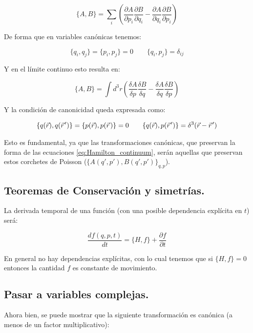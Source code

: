 \begin{equation}
	\{A, B\} = \sum_i\left(\frac{\partial A}{\partial p_i}\frac{\partial B}{\partial q_i} - \frac{\partial A}{\partial q_i}\frac{\partial B}{\partial p_i}\right)
\end{equation}

De forma que en variables canónicas tenemos:

\begin{equation}
	\{q_i,q_j\}=\{p_i,p_j\}=0 \qquad \{q_i,p_j\} = \delta_{ij}
\end{equation}

Y en el límite continuo esto resulta en:

\begin{equation}
	\{A, B\} = \int d^3r \left(\frac{\delta A}{\delta p}\frac{\delta B}{\delta q} - \frac{\delta A}{\delta q}\frac{\delta B}{\delta p}\right)
\end{equation}

Y la condición de canonicidad queda expresada como:

\begin{equation}
	\{q(\vec r),q(\pvec r')\}=\{p(\vec r),p(\pvec r)\}=0 \qquad \{q(\vec r),p(\pvec r')\} = \delta^3(\vec r- \pvec r')
\end{equation}

Esto es fundamental, ya que las transformaciones canónicas, que preservan la forma de las ecuaciones \eqref{eq:Hamilton_continuum}, serán aquellas que preservan estos corchetes de Poisson ($\{A(q',p'), B(q',p')\}_{q,p}$).


\subsection*{Teoremas de Conservación y simetrías.}
La derivada temporal de una función (con una posible dependencia explícita en $t$) será:

\begin{equation}
	\frac{df(q,p,t)}{dt} = \{H, f\} + \frac{\partial f}{\partial t}
\end{equation}

En general no hay dependencias explícitas, con lo cual tenemos que si $\{H, f\}=0$ entonces la cantidad $f$ es constante de movimiento.



\subsection*{Pasar a variables complejas.}
Ahora bien, se puede mostrar que la siguiente transformación es canónica (a menos de un factor multiplicativo):

